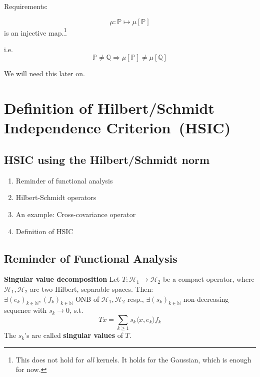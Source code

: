 \clearpage
Requirements:

	\begin{equation*}
		\mu: \mathbb{P} \mapsto \mu[\mathbb{P}]
	\end{equation*}
	is an injective map.\footnote{
		This does not hold for \emph{all} kernels.
		It holds for the Gaussian, which is enough for now.
	}
	
	i.e.
	\begin{equation*}
		\mathbb{P}\ne\mathbb{Q} \Rightarrow \mu[\mathbb{P}] \ne \mu[\mathbb{Q}]
	\end{equation*}
	
	We will need this later on.
	
\clearpage
\section{Definition of Hilbert\-/Schmidt Independence Criterion~(HSIC)}

\clearpage

\subsection{HSIC using the Hilbert\-/Schmidt norm}
\begin{enumerate}
\item Reminder of functional analysis
\item Hilbert-Schmidt operators
\item An example: Cross-covariance operator
\item Definition of HSIC
\end{enumerate}

\clearpage

\subsection*{Reminder of Functional Analysis}
\textbf{Singular value decomposition}
Let $T:\mathcal{H}_1\rightarrow\mathcal{H}_2$ be a compact operator, where $\mathcal{H}_1, \mathcal{H}_2$ are two Hilbert, separable spaces. Then:\\ $\exists(e_k)_{k\in\mathbb{N}},(f_k)_{k\in\mathbb{N}}$ ONB of $\mathcal{H}_1, \mathcal{H}_2$ resp., $\exists (s_k)_{k\in\mathbb{N}}$ non-decreasing sequence with $s_k\rightarrow0$, s.t.
\begin{equation*}
Tx=\sum_{k\geq1}s_k\langle x,e_k\rangle f_k
\end{equation*}
The $s_k$'s are called \textbf{singular values} of $T$.

